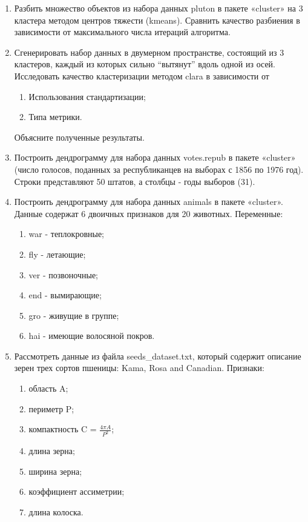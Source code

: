 \documentclass[]{article}
\numberwithin{equation}{section}
\begin{document}
    \begin{enumerate}
        \item Разбить множество объектов из набора данных pluton в пакете «cluster» на 3 кластера методом центров тяжести (kmeans). Сравнить качество разбиения в зависимости от максимального числа итераций алгоритма.
        \item  Сгенерировать набор данных в двумерном пространстве, состоящий из 3 кластеров, каждый из которых сильно “вытянут” вдоль одной из осей. Исследовать качество кластеризации методом clara в зависимости от
            \begin{enumerate}
                \item Использования стандартизации;
                \item Типа метрики.
            \end{enumerate}
        Объясните полученные результаты.
        \item  Построить дендрограмму для набора данных votes.repub в пакете «cluster» (число голосов, поданных за республиканцев на выборах с 1856 по 1976 год). Строки представляют 50 штатов, а столбцы - годы выборов (31).
        \item Построить дендрограмму для набора данных animals в пакете «cluster». Данные содержат 6 двоичных признаков для 20 животных. Переменные:
            \begin{enumerate}
                \item war - теплокровные;
                \item fly - летающие;
                \item ver - позвоночные;
                \item end - вымирающие;
                \item gro - живущие в группе;
                \item hai - имеющие волосяной покров.
            \end{enumerate}
        \item Рассмотреть данные из файла seeds\_dataset.txt, который содержит описание зерен трех сортов пшеницы: Kama, Rosa and Canadian. Признаки:
            \begin{enumerate}
                \item область A;
                \item периметр P;
                \item компактность C = $\frac{4\pi A}{P^2}$;
                \item длина зерна;
                \item ширина зерна;
                \item коэффициент ассиметрии;
                \item длина колоска.
            \end{enumerate}
    \end{enumerate}
\end{document}
